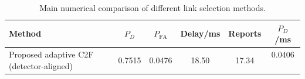 \begin{table}[t]
    \centering
    \caption{Main numerical comparison of different link selection methods.}
    \label{tab:main_summary}
    \begin{tabular}{l c c c c c}
        \hline
        Method & $P_D$ & $P_{\mathrm{FA}}$ & Delay/ms & Reports & $P_D$/ms \\
        \hline
        Proposed adaptive C2F (detector-aligned) & 0.7515 & 0.0476 & 18.50 & 17.34 & 0.0406 \
        \hline
    \end{tabular}
\end{table}
